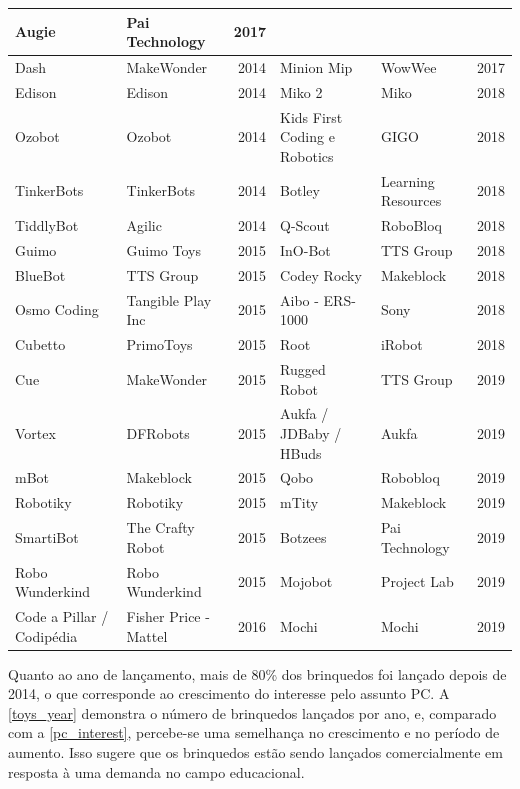 \begin{landscape}
\begin{small}
\begin{longtable}{|p{4.5cm} p{4.5cm} r| p{4.5cm} p{4.5cm} r|}
    Augie & Pai Technology & 2017 \\ \hline
    Dash & MakeWonder & 2014 &
    Minion Mip & WowWee & 2017 \\ \hline
    Edison & Edison & 2014 &
    Miko 2 & Miko & 2018 \\ \hline
    Ozobot & Ozobot & 2014 &
    Kids First Coding e Robotics & GIGO & 2018 \\ \hline
    TinkerBots & TinkerBots & 2014 &
    Botley & Learning Resources & 2018 \\ \hline
    TiddlyBot & Agilic & 2014 &
    Q-Scout & RoboBloq & 2018 \\ \hline
    Guimo & Guimo Toys & 2015 &
    InO-Bot & TTS Group & 2018 \\ \hline
    BlueBot & TTS Group & 2015 &
    Codey Rocky & Makeblock & 2018 \\ \hline
    Osmo Coding & Tangible Play Inc & 2015 &
    Aibo - ERS-1000 & Sony & 2018 \\ \hline
    Cubetto & PrimoToys & 2015 &
    Root & iRobot & 2018 \\ \hline
    Cue & MakeWonder & 2015 &
    Rugged Robot & TTS Group & 2019 \\ \hline
    Vortex & DFRobots & 2015 &
    Aukfa / JDBaby / HBuds & Aukfa & 2019 \\ \hline
    mBot & Makeblock & 2015 &
    Qobo & Robobloq & 2019 \\ \hline
    Robotiky & Robotiky & 2015 &
    mTity & Makeblock & 2019 \\ \hline
    SmartiBot & The Crafty Robot & 2015 &
    Botzees & Pai Technology & 2019 \\ \hline
    Robo Wunderkind & Robo Wunderkind & 2015 &
    Mojobot & Project Lab & 2019 \\ \hline
    Code a Pillar / Codipédia & Fisher Price - Mattel & 2016 &
    Mochi & Mochi & 2019 \\ \hline
\end{longtable}
\end{small}
\end{landscape}

Quanto ao ano de lançamento, mais de 80\% dos brinquedos foi lançado depois de 2014, o que corresponde ao crescimento do interesse pelo assunto \acl{PC}. A \autoref{toys_year} demonstra o número de brinquedos lançados por ano, e, comparado com a \autoref{pc_interest}, percebe-se uma semelhança no crescimento e no período de aumento. Isso sugere que os brinquedos estão sendo lançados comercialmente em resposta à uma demanda no campo educacional.

